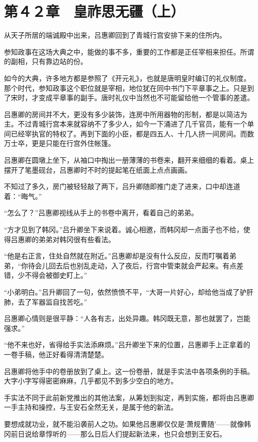 \section{第４２章　皇祚思无疆（上）}

从天子所居的端诚殿中出来，吕惠卿回到了青城行宫安排下来的住所内。

参知政事在这场大典之中，能做的事不多，重要的工作都是正任宰相来担任。所谓的副相，只有靠边站的份。

如今的大典，许多地方都是参照了《开元礼》，也就是唐明皇时编订的礼仪制度。那个时代，参知政事这个职位就是宰相，地位犹在同中书门下平章事之上。只是到了宋时，才变成平章事的副手。唐时礼仪中当然也不可能留给他一个管事的差遣。

吕惠卿的房间并不大，更没有多少装饰，连房中所用器物的形制，都是以简洁为主。不过青城行宫本来就容纳不了多少人，如今一下涌进了几千官员，能有一个单间已经宰执官的特权了。再到下面的小臣，都是四五人、十几人挤一间房间。而数万士卒，更是只能在行宫外住帐篷。

吕惠卿在圆墩上坐下，从袖口中掏出一册薄薄的书卷来，翻开来细细的看着。桌上摆开了笔墨砚台，吕惠卿时不时的提起笔在纸面上点点画画。

不知过了多久，房门被轻轻敲了两下，吕升卿随即推门走了进来，口中却连道着：“晦气。”

“怎么了？”吕惠卿视线从手上的书卷中离开，看着自己的弟弟。

“方才见到了韩冈。”吕升卿坐下来说着。诚心相邀，而韩冈却一点面子也不给，使得吕惠卿的弟弟对韩冈很有些看法。

“他是右正言，住处自然就在附近。”吕惠卿却是没有什么反应，反而叮嘱着弟弟，“你待会儿回去后也别乱走动，入了夜后，行宫中管束就会严起来。有点差错，少不得会被御史盯上。”

“小弟明白。”吕升卿回了一句，依然愤愤不平，“大哥一片好心，却给他当成了驴肝肺，去了军器监自找苦吃。”

吕惠卿心情则是很平静：“人各有志，出处异趣。韩冈既无意，那也就罢了，岂能强求。”

“他不来也好，省得给手实法添麻烦。”吕升卿坐下来的位置，吕惠卿手上正拿着的一卷手稿，他正好看得清清楚楚。

吕惠卿将他手中的卷册放到了桌上。这一份卷册，就是手实法中各项条例的手稿。大字小字写得密密麻麻，几乎都见不到多少空白的地方。

手实法不同于此前新党推出的其他法案，从筹划到拟定，再到实施，都将由吕惠卿一手主持和操控，与王安石全然无关，是属于他的新法。

要想成就功业，就不能沿袭前人之功。如果他吕惠卿仅仅是‘萧规曹随’——就像韩冈前日说给章惇听的——那么日后人们提起新法来，也只会想到王安石。

